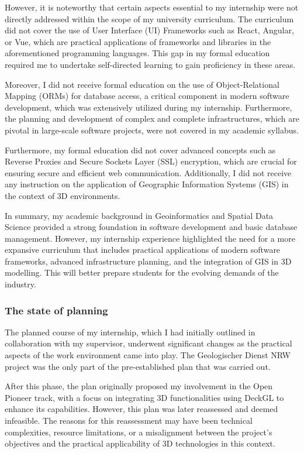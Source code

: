 \documentclass[11pt, titlepage, a4paper]{article}
\begin{document}
However, it is noteworthy that certain aspects essential to my internship were not directly addressed within the scope of my university curriculum. The curriculum did not cover the use of User Interface (UI) Frameworks such as React, Angular, or Vue, which are practical applications of frameworks and libraries in the aforementioned programming languages. This gap in my formal education required me to undertake self-directed learning to gain proficiency in these areas.

Moreover, I did not receive formal education on the use of Object-Relational Mapping (ORMs) for database access, a critical component in modern software development, which was extensively utilized during my internship. Furthermore, the planning and development of complex and complete infrastructures, which are pivotal in large-scale software projects, were not covered in my academic syllabus.

Furthermore, my formal education did not cover advanced concepts such as Reverse Proxies and Secure Sockets Layer (SSL) encryption, which are crucial for ensuring secure and efficient web communication. Additionally, I did not receive any instruction on the application of Geographic Information Systems (GIS) in the context of 3D environments.

In summary, my academic background in Geoinformatics and Spatial Data Science provided a strong foundation in software development and basic database management. However, my internship experience highlighted the need for a more expansive curriculum that includes practical applications of modern software frameworks, advanced infrastructure planning, and the integration of GIS in 3D modelling. This will better prepare students for the evolving demands of the industry.

\subsubsection{The state of planning}
The planned course of my internship, which I had initially outlined in collaboration with my supervisor, underwent significant changes as the practical aspects of the work environment came into play. The Geologischer Dienst NRW project was the only part of the pre-established plan that was carried out.

After this phase, the plan originally proposed my involvement in the Open Pioneer track, with a focus on integrating 3D functionalities using DeckGL to enhance its capabilities. However, this plan was later reassessed and deemed infeasible. The reasons for this reassessment may have been technical complexities, resource limitations, or a misalignment between the project's objectives and the practical applicability of 3D technologies in this context.
\end{document}
